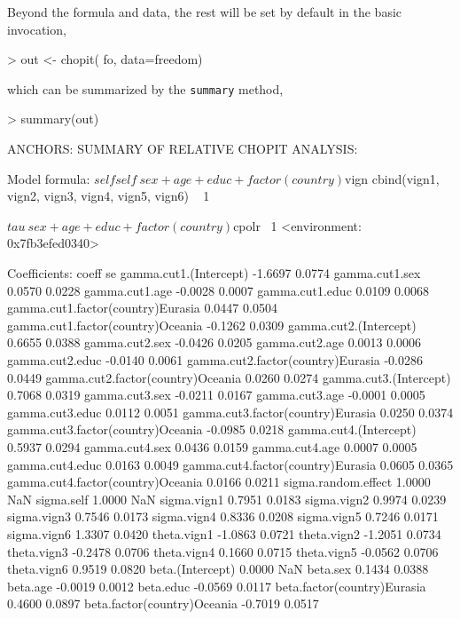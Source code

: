 \documentclass{amsart}
\newcommand{\code}[1]{{\texttt{#1}}}
\begin{document}
Beyond the formula and data, the rest will be set by default in the
basic invocation,
\begin{Schunk}
\begin{Sinput}
> out  <- chopit( fo, data=freedom)
\end{Sinput}
\end{Schunk}
which can be summarized by the \code{summary} method,
\begin{Schunk}
\begin{Sinput}
> summary(out)
\end{Sinput}
\begin{Soutput}
ANCHORS: SUMMARY OF RELATIVE CHOPIT ANALYSIS:

Model formula:
$self
self ~ sex + age + educ + factor(country)

$vign
cbind(vign1, vign2, vign3, vign4, vign5, vign6) ~ 1

$tau
~sex + age + educ + factor(country)

$cpolr
~1
<environment: 0x7fb3efed0340>


Coefficients:
                                    coeff     se
gamma.cut1.(Intercept)            -1.6697 0.0774
gamma.cut1.sex                     0.0570 0.0228
gamma.cut1.age                    -0.0028 0.0007
gamma.cut1.educ                    0.0109 0.0068
gamma.cut1.factor(country)Eurasia  0.0447 0.0504
gamma.cut1.factor(country)Oceania -0.1262 0.0309
gamma.cut2.(Intercept)             0.6655 0.0388
gamma.cut2.sex                    -0.0426 0.0205
gamma.cut2.age                     0.0013 0.0006
gamma.cut2.educ                   -0.0140 0.0061
gamma.cut2.factor(country)Eurasia -0.0286 0.0449
gamma.cut2.factor(country)Oceania  0.0260 0.0274
gamma.cut3.(Intercept)             0.7068 0.0319
gamma.cut3.sex                    -0.0211 0.0167
gamma.cut3.age                    -0.0001 0.0005
gamma.cut3.educ                    0.0112 0.0051
gamma.cut3.factor(country)Eurasia  0.0250 0.0374
gamma.cut3.factor(country)Oceania -0.0985 0.0218
gamma.cut4.(Intercept)             0.5937 0.0294
gamma.cut4.sex                     0.0436 0.0159
gamma.cut4.age                     0.0007 0.0005
gamma.cut4.educ                    0.0163 0.0049
gamma.cut4.factor(country)Eurasia  0.0605 0.0365
gamma.cut4.factor(country)Oceania  0.0166 0.0211
sigma.random.effect                1.0000    NaN
sigma.self                         1.0000    NaN
sigma.vign1                        0.7951 0.0183
sigma.vign2                        0.9974 0.0239
sigma.vign3                        0.7546 0.0173
sigma.vign4                        0.8336 0.0208
sigma.vign5                        0.7246 0.0171
sigma.vign6                        1.3307 0.0420
theta.vign1                       -1.0863 0.0721
theta.vign2                       -1.2051 0.0734
theta.vign3                       -0.2478 0.0706
theta.vign4                        0.1660 0.0715
theta.vign5                       -0.0562 0.0706
theta.vign6                        0.9519 0.0820
beta.(Intercept)                   0.0000    NaN
beta.sex                           0.1434 0.0388
beta.age                          -0.0019 0.0012
beta.educ                         -0.0569 0.0117
beta.factor(country)Eurasia        0.4600 0.0897
beta.factor(country)Oceania       -0.7019 0.0517


\end{Soutput}
\end{Schunk}
\end{document}
